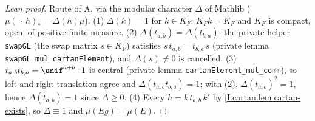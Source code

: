 \begin{proof}[Lean proof]
Route of A, via the modular character $\Delta$ of Mathlib ($\mu(\,\cdot\,h)_*=\Delta(h)\mu$). (1) $\Delta(k)=1$ for $k\in K_F$: $K_Fk=K_F$ and $K_F$ is compact, open, of positive finite measure. (2) $\Delta(t_{a,b})=\Delta(t_{b,a})$: the private helper \texttt{swapGL} (the swap matrix $s\in K_F$) satisfies $s\,t_{a,b}=t_{b,a}\,s$ (private lemma \texttt{swapGL\_mul\_cartanElement}), and $\Delta(s)\neq0$ is cancelled. (3) $t_{a,b}t_{b,a}=\unif^{a+b}\cdot1$ is central (private lemma \texttt{cartanElement\_mul\_comm}), so left and right translation agree and $\Delta(t_{a,b}t_{b,a})=1$; with (2), $\Delta(t_{a,b})^2=1$, hence $\Delta(t_{a,b})=1$ since $\Delta\ge0$. (4) Every $h=k\,t_{a,b}\,k'$ by \cref{I.cartan.lem:cartan-exists}, so $\Delta\equiv1$ and $\mu(Eg)=\mu(E)$.
\end{proof}

